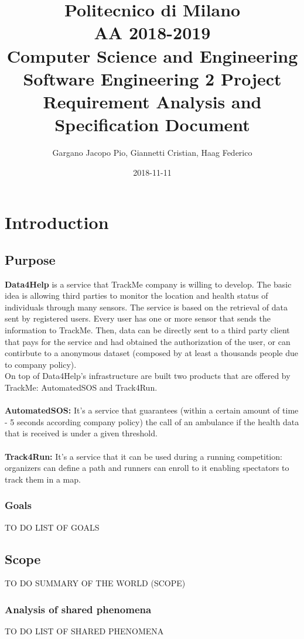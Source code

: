 \documentclass{report}
\title{
\small Politecnico di Milano\\
\small AA 2018-2019\\
\large Computer Science and Engineering\\
\Large Software Engineering 2 Project\\
\huge Requirement Analysis and Specification Document
}
\date{2018-11-11}
\author{
\large Gargano Jacopo Pio, Giannetti Cristian, Haag Federico}
\begin{document}
	\maketitle
	
	\newpage
	\tableofcontents
	
	\newpage
	\chapter{Introduction}
		\section{Purpose}
			{\bf Data4Help } is a service that TrackMe company is willing to develop. The basic idea is allowing third parties to monitor the location and health status of individuals through many sensors. The service is based on the retrieval of data sent by registered users. Every user has one or more sensor that sends the information to TrackMe. Then, data can be directly sent to a third party client that pays for the service and had obtained the authorization of the user, or can contirbute to a anonymous dataset (composed by at least a thousands people due to company policy).\\
			On top of Data4Help's infrastructure are built two products that are offered by TrackMe: AutomatedSOS and Track4Run.\\
			\\{\bf AutomatedSOS:} It's a service that guarantees (within a certain amount of time - 5 seconds according company policy) the call of an ambulance if the health data that is received is under a given threshold. \\\\{\bf Track4Run:} It's a service that it can be used during a running competition: organizers can define a path and runners can enroll to it enabling spectators to track them in a map.
			\subsection{Goals}
			TO DO LIST OF GOALS
		\section{Scope}
			TO DO SUMMARY OF THE WORLD (SCOPE)
			\subsection{Analysis of shared phenomena}
			TO DO LIST OF SHARED PHENOMENA
			
\end{document}
